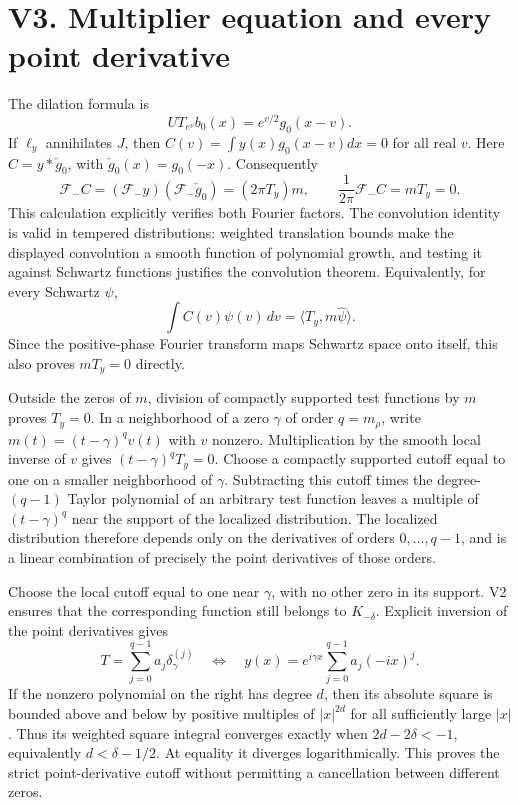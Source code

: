 \section{V3. Multiplier equation and every point
derivative}\label{v3.-multiplier-equation-and-every-point-derivative}

The dilation formula is \[
UT_{e^v}b_0(x)=e^{v/2}g_0(x-v).
\] If \(\ell_y\) annihilates \(J\), then \(C(v)=\int y(x)g_0(x-v)dx=0\)
for all real \(v\). Here \(C=y*\check g_0\), with
\(\check g_0(x)=g_0(-x)\). Consequently \[
\mathcal F_-C
=(\mathcal F_-y)(\mathcal F_-\check g_0)
=(2\pi T_y)m,
\qquad
\frac1{2\pi}\mathcal F_-C=mT_y=0.
\] This calculation explicitly verifies both Fourier factors. The
convolution identity is valid in tempered distributions: weighted
translation bounds make the displayed convolution a smooth function of
polynomial growth, and testing it against Schwartz functions justifies
the convolution theorem. Equivalently, for every Schwartz \(\psi\), \[
\int C(v)\psi(v)\,dv
=\langle T_y,m\widehat\psi\rangle.
\] Since the positive-phase Fourier transform maps Schwartz space onto
itself, this also proves \(mT_y=0\) directly.

Outside the zeros of \(m\), division of compactly supported test
functions by \(m\) proves \(T_y=0\). In a neighborhood of a zero
\(\gamma\) of order \(q=m_\rho\), write \(m(t)=(t-\gamma)^qv(t)\) with
\(v\) nonzero. Multiplication by the smooth local inverse of \(v\) gives
\((t-\gamma)^qT_y=0\). Choose a compactly supported cutoff equal to one
on a smaller neighborhood of \(\gamma\). Subtracting this cutoff times
the degree-\((q-1)\) Taylor polynomial of an arbitrary test function
leaves a multiple of \((t-\gamma)^q\) near the support of the localized
distribution. The localized distribution therefore depends only on the
derivatives of orders \(0,\ldots,q-1\), and is a linear combination of
precisely the point derivatives of those orders.

Choose the local cutoff equal to one near \(\gamma\), with no other zero
in its support. V2 ensures that the corresponding function still belongs
to \(K_{-\delta}\). Explicit inversion of the point derivatives gives \[
T=\sum_{j=0}^{q-1}a_j\delta_\gamma^{(j)}
\quad\Longleftrightarrow\quad
y(x)=e^{i\gamma x}\sum_{j=0}^{q-1}a_j(-ix)^j.
\] If the nonzero polynomial on the right has degree \(d\), then its
absolute square is bounded above and below by positive multiples of
\(|x|^{2d}\) for all sufficiently large \(|x|\). Thus its weighted
square integral converges exactly when \(2d-2\delta<-1\), equivalently
\(d<\delta-1/2\). At equality it diverges logarithmically. This proves
the strict point-derivative cutoff without permitting a cancellation
between different zeros.

